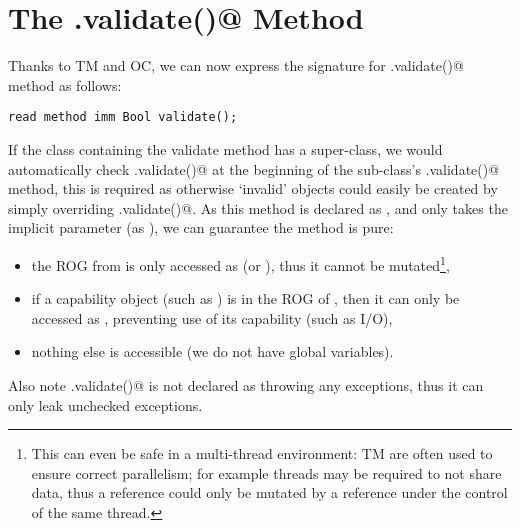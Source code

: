 \section{The \Q@.validate()@ Method }
\label{s:validate}
Thanks to TM and OC, we can now express the signature for \Q@.validate()@ method as follows:
\saveSpace
\begin{lstlisting}
read method imm Bool validate();
\end{lstlisting}
\saveSpace
If the class containing the validate method has a super-class, we would automatically check \Q@super.validate()@ at the beginning of the sub-class’s \Q@.validate()@ method, this is required as otherwise `invalid' objects could easily be created by simply overriding \Q@.validate()@.
As this method is declared as \Q@read@, and only takes the implicit parameter \Q@this@ (as \Q@read@), we can guarantee the method is pure:
\begin{itemize}
\item the ROG from \Q@this@ is only accessed as \Q@read@ (or \Q@imm@), thus it cannot be mutated\footnote{
This can even be safe in a multi-thread environment: TM are often used to ensure correct parallelism; for example threads may be required to not share \Q@mut@ data, thus a \Q@read@ reference could only be mutated by a \Q@mut@ reference under the control of the same thread.
},
\item if a capability object (such as \Q@System@) is in the ROG of \Q@this@, then it can only be accessed as \Q@read@, preventing use of its capability (such as I/O),
\item nothing else is accessible (we do not have global variables).
\end{itemize}

\noindent Also note \Q@.validate()@ is not declared as throwing any exceptions, thus it can only leak unchecked exceptions.


